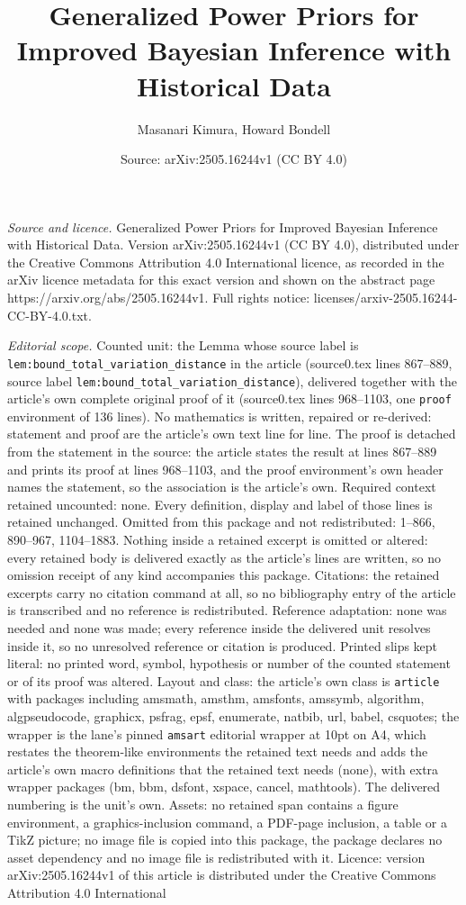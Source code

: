 \documentclass[10pt,a4paper]{amsart}
\title[Generalized Power Priors for Improved Bayesian Inference wit]{Generalized Power Priors for Improved Bayesian Inference with Historical Data}
\author{Masanari Kimura, Howard Bondell}
\date{Source: arXiv:2505.16244v1 (CC BY 4.0)}
\begin{document}
\maketitle

\noindent\emph{Source and licence.} Generalized Power Priors for Improved Bayesian Inference with Historical Data. Version arXiv:2505.16244v1 (CC BY 4.0), distributed under the Creative Commons Attribution 4.0 International licence, as recorded in the arXiv licence metadata for this exact version and shown on the abstract page https://arxiv.org/abs/2505.16244v1. Full rights notice: licenses/arxiv-2505.16244-CC-BY-4.0.txt.\par\smallskip

\noindent\textit{Editorial scope.} Counted unit: the Lemma whose source label is \texttt{lem:bound\_total\_variation\_distance} in the article (source0.tex lines 867--889, source label \texttt{lem:bound\_total\_variation\_distance}), delivered together with the article's own complete original proof of it (source0.tex lines 968--1103, one \texttt{proof} environment of 136 lines). No mathematics is written, repaired or re-derived: statement and proof are the article's own text line for line. The proof is detached from the statement in the source: the article states the result at lines 867--889 and prints its proof at lines 968--1103, and the proof environment's own header names the statement, so the association is the article's own. Required context retained uncounted: none. Every definition, display and label of those lines is retained unchanged. Omitted from this package and not redistributed: 1--866, 890--967, 1104--1883. Nothing inside a retained excerpt is omitted or altered: every retained body is delivered exactly as the article's lines are written, so no omission receipt of any kind accompanies this package. Citations: the retained excerpts carry no citation command at all, so no bibliography entry of the article is transcribed and no reference is redistributed. Reference adaptation: none was needed and none was made; every reference inside the delivered unit resolves inside it, so no unresolved reference or citation is produced. Printed slips kept literal: no printed word, symbol, hypothesis or number of the counted statement or of its proof was altered. Layout and class: the article's own class is \texttt{article} with packages including amsmath, amsthm, amsfonts, amssymb, algorithm, algpseudocode, graphicx, psfrag, epsf, enumerate, natbib, url, babel, csquotes; the wrapper is the lane's pinned \texttt{amsart} editorial wrapper at 10pt on A4, which restates the theorem-like environments the retained text needs and adds the article's own macro definitions that the retained text needs (none), with extra wrapper packages (bm, bbm, dsfont, xspace, cancel, mathtools). The delivered numbering is the unit's own. Assets: no retained span contains a figure environment, a graphics-inclusion command, a PDF-page inclusion, a table or a TikZ picture; no image file is copied into this package, the package declares no asset dependency and no image file is redistributed with it. Licence: version arXiv:2505.16244v1 of this article is distributed under the Creative Commons Attribution 4.0 International 
\end{document}
